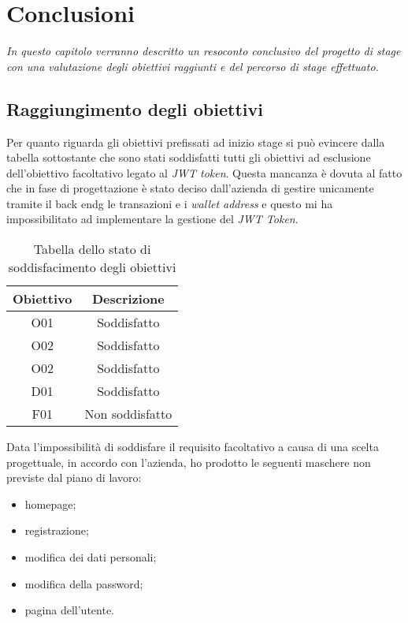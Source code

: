 
\chapter{Conclusioni}
\label{cap:conclusioni}

\textit{In questo capitolo verranno descritto un resoconto conclusivo del progetto di stage con una valutazione degli obiettivi raggiunti e del percorso di stage effettuato.}

\section{Raggiungimento degli obiettivi}
\label{sec:raggiungimento-obiettivi}

Per quanto riguarda gli obiettivi prefissati ad inizio stage si può evincere dalla tabella sottostante che sono stati soddisfatti tutti gli obiettivi ad esclusione dell'obiettivo facoltativo legato al \textit{JWT token}. Questa mancanza è dovuta al fatto che in fase di progettazione è stato deciso dall'azienda di gestire unicamente tramite il \gls{back endg} le transazioni e i \textit{wallet address} e questo mi ha impossibilitato ad implementare la gestione del \textit{JWT Token}.

\begin{table}[H]
	\caption{Tabella dello stato di soddisfacimento degli obiettivi}
	\label{tab:obiettivi-raggiunti}
	\renewcommand{\arraystretch}{1.6}
	\begin{center}
	\begin{tabularx}{0.4\textwidth}{c|c}
		\hline\hline
		\textbf{Obiettivo} & \textbf{Descrizione}\\
		\hline
		O01 & Soddisfatto\\
		\hline
		O02 & Soddisfatto\\
		\hline
		O02 & Soddisfatto\\
		\hline
		D01 & Soddisfatto\\
		\hline
		F01 & Non soddisfatto\\
		\hline
	\end{tabularx}
	\end{center}
\end{table}%

Data l'impossibilità di soddisfare il requisito facoltativo a causa di una scelta progettuale, in accordo con l'azienda, ho prodotto le seguenti maschere non previste dal piano di lavoro:
\begin{itemize}
	\item homepage;
	\item registrazione;
	\item modifica dei dati personali;
	\item modifica della password;
	\item pagina dell'utente.
\end{itemize}

